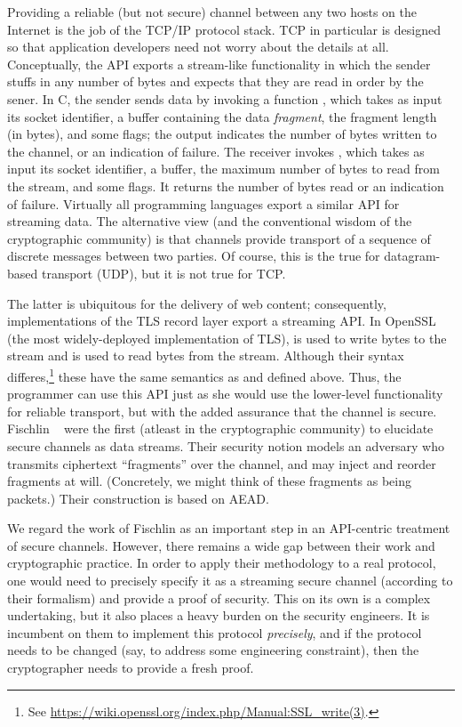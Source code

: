 Providing a reliable (but not secure) channel between any two hosts on the Internet
is the job of the TCP/IP protocol stack. TCP in particular is designed so that
application developers need not worry about the details at all.
%
Conceptually, the API exports a stream-like functionality in which the sender
stuffs in any number of bytes and expects that they are read in order by the
sener.
%
In C, the sender sends data by invoking a function , which
takes as input its socket identifier, a buffer containing the data
\emph{fragment}, the fragment length (in bytes), and some flags; the output
indicates the number of bytes written to the channel, or an indication of
failure. The receiver invokes , which takes as input its socket
identifier, a buffer, the maximum number of bytes to read from the stream, and
some flags. It returns the number of bytes read or an indication of failure.
%
Virtually all programming languages export a similar API for streaming data. The
alternative view (and the conventional wisdom of the cryptographic community) is
that channels provide transport of a sequence of discrete messages between two
parties. Of course, this is the true for datagram-based transport (UDP), but it
is not true for TCP.

The latter is ubiquitous for the delivery of web content; consequently,
implementations of the TLS record layer export a streaming API. In OpenSSL (the
most widely-deployed implementation of TLS),  is used to
write bytes to the stream and  is used to read bytes from
the stream. Although their syntax differes,\footnote{ See
\url{https://wiki.openssl.org/index.php/Manual:SSL_write(3)}.} these have the
same semantics as  and  defined above. Thus,
the programmer can use this API just as she would use the lower-level
functionality for reliable transport, but with the added assurance that the
channel is secure.
%
Fischlin \etal~\cite{FPMG15} were the first (atleast in the cryptographic
community) to elucidate secure channels as data streams.
%
Their security notion models an adversary who transmits ciphertext ``fragments''
over the channel, and may inject and reorder fragments at will. (Concretely, we
might think of these fragments as being packets.) Their construction is based on
AEAD.

We regard the work of Fischlin \etal as an important step in an API-centric
treatment of secure channels.
%
However, there remains a wide gap between their work and cryptographic practice.
In order to apply their methodology to a real protocol, one would need to
precisely specify it as a streaming secure channel (according to their
formalism) and provide a proof of security. This on its own is a complex
undertaking, but it also places a heavy burden on the security engineers. It is
incumbent on them to implement this protocol \emph{precisely}, and if the
protocol needs to be changed (say, to address some engineering constraint), then
the cryptographer needs to provide a fresh proof.
%

